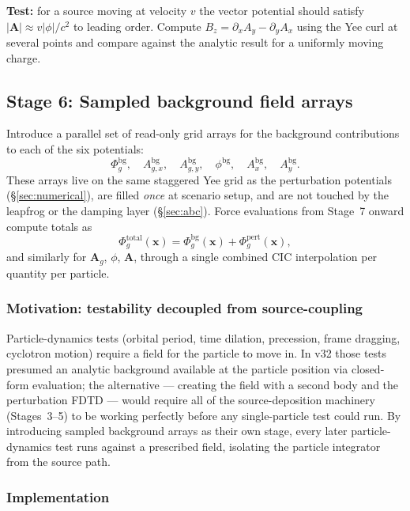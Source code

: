 \documentclass[11pt,a4paper]{article}
\newcommand{\vv}[1]{\mathbf{#1}}
\newcommand{\Phig}{\Phi_g}
\newcommand{\Ag}{\vv{A}_g}
\begin{document}
\textbf{Test:} for a source moving at velocity $v$ the vector potential should satisfy $|\vv{A}| \approx v|\phi|/c^2$ to leading order.  Compute $B_z = \partial_x A_y - \partial_y A_x$ using the Yee curl at several points and compare against the analytic result for a uniformly moving charge.

\subsection{Stage 6: Sampled background field arrays}
\label{sec:stage_bg}

Introduce a parallel set of read-only grid arrays for the background contributions to each of the six potentials:
\[
  \Phig^{\mathrm{bg}}, \quad A_{g,x}^{\mathrm{bg}}, \quad A_{g,y}^{\mathrm{bg}}, \quad \phi^{\mathrm{bg}}, \quad A_x^{\mathrm{bg}}, \quad A_y^{\mathrm{bg}}.
\]
These arrays live on the same staggered Yee grid as the perturbation potentials (§\ref{sec:numerical}), are filled \emph{once} at scenario setup, and are not touched by the leapfrog or the damping layer (§\ref{sec:abc}).  Force evaluations from Stage~7 onward compute totals as
\[
  \Phig^{\mathrm{total}}(\vv{x}) = \Phig^{\mathrm{bg}}(\vv{x}) + \Phig^{\mathrm{pert}}(\vv{x}),
\]
and similarly for $\Ag$, $\phi$, $\vv{A}$, through a single combined CIC interpolation per quantity per particle.

\subsubsection*{Motivation: testability decoupled from source-coupling}

Particle-dynamics tests (orbital period, time dilation, precession, frame dragging, cyclotron motion) require a field for the particle to move in.  In v32 those tests presumed an analytic background available at the particle position via closed-form evaluation; the alternative --- creating the field with a second body and the perturbation FDTD --- would require all of the source-deposition machinery (Stages~3--5) to be working perfectly before any single-particle test could run.  By introducing sampled background arrays as their own stage, every later particle-dynamics test runs against a prescribed field, isolating the particle integrator from the source path.

\subsubsection*{Implementation}
\end{document}
